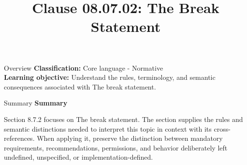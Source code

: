\documentclass[10pt,letterpaper]{article}
\title{Clause 08.07.02: The Break Statement}
\author{}
\date{}
\begin{document}
\maketitle
\begin{CornellOverviewBox}{Overview}
\textbf{Classification:} Core language - Normative\\[2pt]
\textbf{Learning objective:} Understand the rules, terminology, and semantic consequences associated with The break statement.
\end{CornellOverviewBox}\begin{CornellSummaryBox}{Summary}
{\sffamily\bfseries\color{Accent} Summary}\par\vspace{3pt}Section 8.7.2 focuses on The break statement. The section supplies the rules and semantic distinctions needed to interpret this topic in context with its cross-references. When applying it, preserve the distinction between mandatory requirements, recommendations, permissions, and behavior deliberately left undefined, unspecified, or implementation-defined.
\end{CornellSummaryBox}
\end{document}
